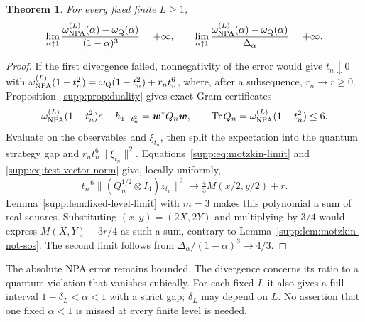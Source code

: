 \documentclass[11pt]{article}
\newtheorem{theorem}{Theorem}
\theoremstyle{remark}\newtheorem{remark}[theorem]{Remark}
\begin{document}
\begin{theorem}
\label{supp:thm:fixed-level}
For every fixed finite $L\geq1$,
\begin{equation}
\lim_{\alpha\uparrow1}
\frac{\omega_{\rm NPA}^{(L)}(\alpha)-\omega_{\rm Q}(\alpha)}{(1-\alpha)^3}
=+\infty,
\qquad
\lim_{\alpha\uparrow1}
\frac{\omega_{\rm NPA}^{(L)}(\alpha)-\omega_{\rm Q}(\alpha)}{\Delta_\alpha}
=+\infty.
\label{supp:eq:main-divergence}
\end{equation}
\end{theorem}
\begin{proof}
If the first divergence failed, nonnegativity of the error would give
$t_n\downarrow0$ with
$\omega_{\rm NPA}^{(L)}(1-t_n^2)=\omega_{\rm Q}(1-t_n^2)+r_nt_n^6$,
where, after a subsequence, $r_n\to r\geq0$.
Proposition~\ref{supp:prop:duality} gives exact Gram certificates
\[
\omega_{\rm NPA}^{(L)}(1-t_n^2)e-h_{1-t_n^2}=\bm w^*Q_n\bm w,
\qquad \operatorname{Tr} Q_n=\omega_{\rm NPA}^{(L)}(1-t_n^2)\leq6.
\]
Evaluate on the observables and $\xi_{t_n}$, then split the expectation
into the quantum strategy gap and $r_nt_n^6\|\xi_{t_n}\|^2$.
Equations~\eqref{supp:eq:motzkin-limit} and \eqref{supp:eq:test-vector-norm}
give, locally uniformly,
\begin{equation}
t_n^{-6}\|(Q_n^{1/2}\otimes I_4)z_{t_n}\|^2
\longrightarrow\tfrac43M(x/2,y/2)+r.
\label{supp:eq:certificate-limit}
\end{equation}
Lemma~\ref{supp:lem:fixed-level-limit} with $m=3$ makes this polynomial
a sum of real squares. Substituting $(x,y)=(2X,2Y)$ and multiplying by
$3/4$ would express $M(X,Y)+3r/4$ as such a sum, contrary to
Lemma~\ref{supp:lem:motzkin-not-sos}. The second limit follows from
$\Delta_\alpha/(1-\alpha)^3\to4/3$.
\end{proof}
The absolute NPA error remains bounded. The divergence concerns its ratio
to a quantum violation that vanishes cubically. For each fixed $L$ it
also gives a full interval $1-\delta_L<\alpha<1$ with a strict gap;
$\delta_L$ may depend on $L$. No assertion that one fixed
$\alpha<1$ is missed at every finite level is needed.
\end{document}

